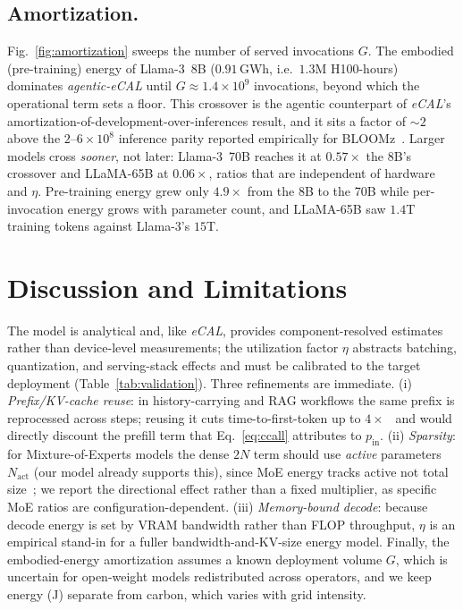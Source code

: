 \documentclass[journal]{IEEEtran}
\newif\ifshowchanges \showchangestrue
\newcommand{\NEW}{\ifshowchanges\color{blue}\fi}
\newcommand{\OLD}{\ifshowchanges\color{black}\fi}
\newcommand{\embLlamaEightB}{$0.91$\,GWh}      %
\newcommand{\crossoverG}{\ensuremath{1.4\times10^{9}}}    %
\newcommand{\agecal}{\textit{agentic-eCAL}}
\newcommand{\ecal}{\textit{eCAL}}
\begin{document}
\subsection{Amortization.} Fig.~\ref{fig:amortization} sweeps the number of served invocations $G$. The
embodied (pre-training) energy of Llama-3~8B (\embLlamaEightB{}, i.e.\ $1.3$M H100-hours) dominates
\agecal{} until $G\approx\crossoverG$ invocations, beyond which the operational term sets a floor.
This crossover is the agentic counterpart of \ecal{}'s amortization-of-development-over-inferences
result, and \NEW{}it sits a factor of $\sim\!2$ above the $2$--$6\times10^{8}$\OLD{} inference parity reported
empirically for BLOOMz~\cite{luccioni2024power}. \NEW{}Larger models cross \emph{sooner}, not later:
Llama-3~70B reaches it at $0.57\times$ the 8B's crossover and LLaMA-65B at $0.06\times$, ratios that
are independent of hardware and $\eta$. Pre-training energy grew only $4.9\times$ from the 8B to the
70B while per-invocation energy grows with parameter count, and LLaMA-65B saw $1.4$T training tokens
against Llama-3's $15$T.\OLD{}






\section{Discussion and Limitations}\label{sec:discussion}
The model is analytical and, like \ecal{}, provides component-resolved estimates rather than
device-level measurements; the utilization factor $\eta$ abstracts batching, quantization, and
serving-stack effects and must be calibrated to the target deployment (Table~\ref{tab:validation}).
Three refinements are immediate. (i) \emph{Prefix/KV-cache reuse}: in history-carrying and RAG
workflows the same prefix is reprocessed across steps; reusing it cuts time-to-first-token up to
$4\times$~\cite{ragcache2024} and would directly discount the prefill term that Eq.~\eqref{eq:ccall}
attributes to $p_{\mathrm{in}}$. (ii) \emph{Sparsity}: for Mixture-of-Experts models the dense $2N$
term should use \emph{active} parameters $N_{\mathrm{act}}$ (our model already supports this), since
MoE energy tracks active not total size~\cite{mlenergy_v3}; we report the directional effect rather
than a fixed multiplier, as specific MoE ratios are configuration-dependent. (iii) \emph{Memory-bound
decode}: because decode energy is set by VRAM bandwidth rather than FLOP throughput, $\eta$ is an
empirical stand-in for a fuller bandwidth-and-KV-size energy model. Finally, the embodied-energy
amortization assumes a known deployment volume $G$, which is uncertain for open-weight models
redistributed across operators, and we keep energy (J) separate from carbon, which varies with grid
intensity.
\end{document}
